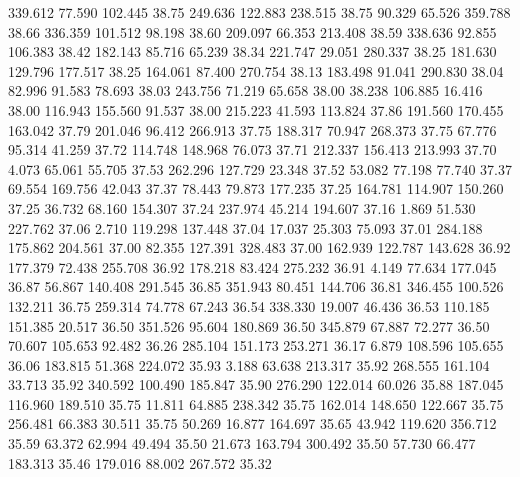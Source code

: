  339.612   77.590  102.445        38.75
 249.636  122.883  238.515        38.75
  90.329   65.526  359.788        38.66
 336.359  101.512   98.198        38.60
 209.097   66.353  213.408        38.59
 338.636   92.855  106.383        38.42
 182.143   85.716   65.239        38.34
 221.747   29.051  280.337        38.25
 181.630  129.796  177.517        38.25
 164.061   87.400  270.754        38.13
 183.498   91.041  290.830        38.04
  82.996   91.583   78.693        38.03
 243.756   71.219   65.658        38.00
  38.238  106.885   16.416        38.00
 116.943  155.560   91.537        38.00
 215.223   41.593  113.824        37.86
 191.560  170.455  163.042        37.79
 201.046   96.412  266.913        37.75
 188.317   70.947  268.373        37.75
  67.776   95.314   41.259        37.72
 114.748  148.968   76.073        37.71
 212.337  156.413  213.993        37.70
   4.073   65.061   55.705        37.53
 262.296  127.729   23.348        37.52
  53.082   77.198   77.740        37.37
  69.554  169.756   42.043        37.37
  78.443   79.873  177.235        37.25
 164.781  114.907  150.260        37.25
  36.732   68.160  154.307        37.24
 237.974   45.214  194.607        37.16
   1.869   51.530  227.762        37.06
   2.710  119.298  137.448        37.04
  17.037   25.303   75.093        37.01
 284.188  175.862  204.561        37.00
  82.355  127.391  328.483        37.00
 162.939  122.787  143.628        36.92
 177.379   72.438  255.708        36.92
 178.218   83.424  275.232        36.91
   4.149   77.634  177.045        36.87
  56.867  140.408  291.545        36.85
 351.943   80.451  144.706        36.81
 346.455  100.526  132.211        36.75
 259.314   74.778   67.243        36.54
 338.330   19.007   46.436        36.53
 110.185  151.385   20.517        36.50
 351.526   95.604  180.869        36.50
 345.879   67.887   72.277        36.50
  70.607  105.653   92.482        36.26
 285.104  151.173  253.271        36.17
   6.879  108.596  105.655        36.06
 183.815   51.368  224.072        35.93
   3.188   63.638  213.317        35.92
 268.555  161.104   33.713        35.92
 340.592  100.490  185.847        35.90
 276.290  122.014   60.026        35.88
 187.045  116.960  189.510        35.75
  11.811   64.885  238.342        35.75
 162.014  148.650  122.667        35.75
 256.481   66.383   30.511        35.75
  50.269   16.877  164.697        35.65
  43.942  119.620  356.712        35.59
  63.372   62.994   49.494        35.50
  21.673  163.794  300.492        35.50
  57.730   66.477  183.313        35.46
 179.016   88.002  267.572        35.32
